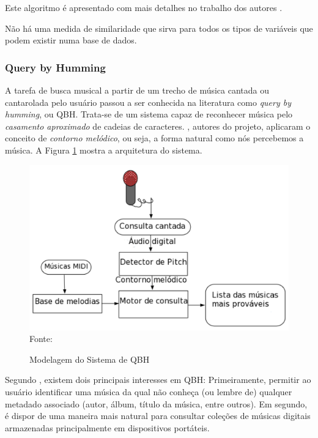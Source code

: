 \begin{itemize}
    Este algoritmo é apresentado com mais detalhes no trabalho dos autores .
\end{itemize}

Não há uma medida de similaridade que sirva para todos os tipos de variáveis que podem existir numa base de dados.

\subsubsection{Query by Humming} \label{subsubsec:qbh}
A tarefa de busca musical a partir de um trecho de música cantada ou cantarolada pelo usuário passou a ser conhecida na literatura como \textit{query by humming}, ou QBH. Trata-se de um sistema capaz de reconhecer música pelo \textit{casamento aproximado} de cadeias de caracteres. , autores do projeto, aplicaram o conceito de \textit{contorno melódico}, ou seja, a forma natural como nós percebemos a música. A Figura \ref{fig:qbh} mostra a arquitetura do sistema.

\begin{figure}[!htb]
   \centering
   \caption{Modelagem do Sistema de QBH}\label{fig:qbh} 
   \includegraphics[scale=0.50]{figuras/qbh.png}
   \\Fonte: \cite{santos2011}
\end{figure}

Segundo , existem dois principais interesses em QBH: Primeiramente, permitir ao usuário identificar uma música da qual não conheça (ou lembre de) qualquer metadado associado (autor, álbum, título da música, entre outros). Em segundo, é dispor de uma maneira mais natural para consultar coleções de músicas digitais armazenadas principalmente em dispositivos portáteis.

